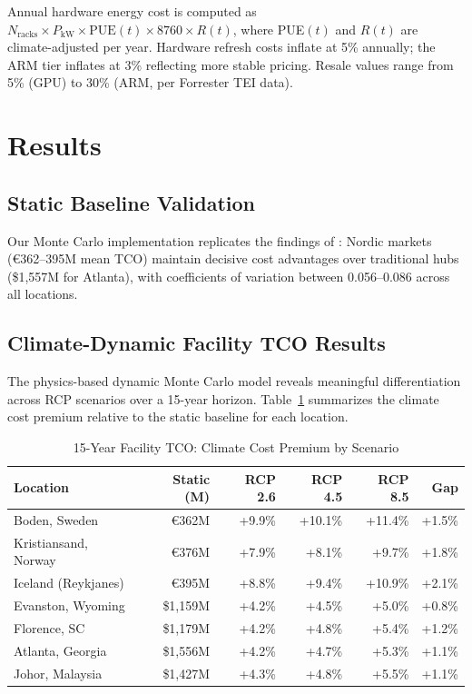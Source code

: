 \documentclass[12pt,a4paper]{article}
\begin{document}
Annual hardware energy cost is computed as $N_{\text{racks}} \times P_{\text{kW}} \times \text{PUE}(t) \times 8760 \times R(t)$, where PUE$(t)$ and $R(t)$ are climate-adjusted per year. Hardware refresh costs inflate at 5\% annually; the ARM tier inflates at 3\% reflecting more stable pricing. Resale values range from 5\% (GPU) to 30\% (ARM, per Forrester TEI data).

\section{Results}
\label{sec:results}

\subsection{Static Baseline Validation}

Our Monte Carlo implementation replicates the findings of \citet{dccore2025}: Nordic markets (€362--395M mean TCO) maintain decisive cost advantages over traditional hubs (\$1,557M for Atlanta), with coefficients of variation between 0.056--0.086 across all locations.

\subsection{Climate-Dynamic Facility TCO Results}

The physics-based dynamic Monte Carlo model reveals meaningful differentiation across RCP scenarios over a 15-year horizon. Table~\ref{tab:facility_climate} summarizes the climate cost premium relative to the static baseline for each location.

\begin{table}[H]
\centering
\caption{15-Year Facility TCO: Climate Cost Premium by Scenario}
\label{tab:facility_climate}
\small
\begin{tabular}{lrrrrr}
\toprule
\textbf{Location} & \textbf{Static (M)} & \textbf{RCP 2.6} & \textbf{RCP 4.5} & \textbf{RCP 8.5} & \textbf{Gap} \\
\midrule
Boden, Sweden       & €362M & +9.9\% & +10.1\% & +11.4\% & +1.5\% \\
Kristiansand, Norway & €376M & +7.9\% & +8.1\% & +9.7\% & +1.8\% \\
Iceland (Reykjanes) & €395M & +8.8\% & +9.4\% & +10.9\% & +2.1\% \\
Evanston, Wyoming   & \$1,159M & +4.2\% & +4.5\% & +5.0\% & +0.8\% \\
Florence, SC        & \$1,179M & +4.2\% & +4.8\% & +5.4\% & +1.2\% \\
Atlanta, Georgia    & \$1,556M & +4.2\% & +4.7\% & +5.3\% & +1.1\% \\
Johor, Malaysia     & \$1,427M & +4.3\% & +4.8\% & +5.5\% & +1.1\% \\
\bottomrule
\end{tabular}
\end{table}
\end{document}
